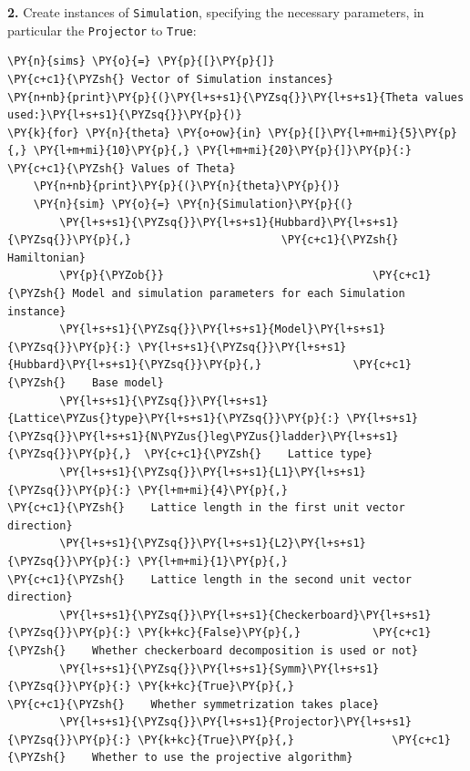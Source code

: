     \textbf{2.} Create instances of \texttt{Simulation}, specifying the
necessary parameters, in particular the \texttt{Projector} to
\texttt{True}:

    \begin{tcolorbox}[breakable, size=fbox, boxrule=1pt, pad at break*=1mm,colback=cellbackground, colframe=cellborder]
\begin{Verbatim}[commandchars=\\\{\}]
\PY{n}{sims} \PY{o}{=} \PY{p}{[}\PY{p}{]}                                \PY{c+c1}{\PYZsh{} Vector of Simulation instances}
\PY{n+nb}{print}\PY{p}{(}\PY{l+s+s1}{\PYZsq{}}\PY{l+s+s1}{Theta values used:}\PY{l+s+s1}{\PYZsq{}}\PY{p}{)}
\PY{k}{for} \PY{n}{theta} \PY{o+ow}{in} \PY{p}{[}\PY{l+m+mi}{5}\PY{p}{,} \PY{l+m+mi}{10}\PY{p}{,} \PY{l+m+mi}{20}\PY{p}{]}\PY{p}{:}                \PY{c+c1}{\PYZsh{} Values of Theta}
    \PY{n+nb}{print}\PY{p}{(}\PY{n}{theta}\PY{p}{)}
    \PY{n}{sim} \PY{o}{=} \PY{n}{Simulation}\PY{p}{(}
        \PY{l+s+s1}{\PYZsq{}}\PY{l+s+s1}{Hubbard}\PY{l+s+s1}{\PYZsq{}}\PY{p}{,}                       \PY{c+c1}{\PYZsh{} Hamiltonian}
        \PY{p}{\PYZob{}}                                \PY{c+c1}{\PYZsh{} Model and simulation parameters for each Simulation instance}
        \PY{l+s+s1}{\PYZsq{}}\PY{l+s+s1}{Model}\PY{l+s+s1}{\PYZsq{}}\PY{p}{:} \PY{l+s+s1}{\PYZsq{}}\PY{l+s+s1}{Hubbard}\PY{l+s+s1}{\PYZsq{}}\PY{p}{,}              \PY{c+c1}{\PYZsh{}    Base model}
        \PY{l+s+s1}{\PYZsq{}}\PY{l+s+s1}{Lattice\PYZus{}type}\PY{l+s+s1}{\PYZsq{}}\PY{p}{:} \PY{l+s+s1}{\PYZsq{}}\PY{l+s+s1}{N\PYZus{}leg\PYZus{}ladder}\PY{l+s+s1}{\PYZsq{}}\PY{p}{,}  \PY{c+c1}{\PYZsh{}    Lattice type}
        \PY{l+s+s1}{\PYZsq{}}\PY{l+s+s1}{L1}\PY{l+s+s1}{\PYZsq{}}\PY{p}{:} \PY{l+m+mi}{4}\PY{p}{,}                         \PY{c+c1}{\PYZsh{}    Lattice length in the first unit vector direction}
        \PY{l+s+s1}{\PYZsq{}}\PY{l+s+s1}{L2}\PY{l+s+s1}{\PYZsq{}}\PY{p}{:} \PY{l+m+mi}{1}\PY{p}{,}                         \PY{c+c1}{\PYZsh{}    Lattice length in the second unit vector direction}
        \PY{l+s+s1}{\PYZsq{}}\PY{l+s+s1}{Checkerboard}\PY{l+s+s1}{\PYZsq{}}\PY{p}{:} \PY{k+kc}{False}\PY{p}{,}           \PY{c+c1}{\PYZsh{}    Whether checkerboard decomposition is used or not}
        \PY{l+s+s1}{\PYZsq{}}\PY{l+s+s1}{Symm}\PY{l+s+s1}{\PYZsq{}}\PY{p}{:} \PY{k+kc}{True}\PY{p}{,}                    \PY{c+c1}{\PYZsh{}    Whether symmetrization takes place}
        \PY{l+s+s1}{\PYZsq{}}\PY{l+s+s1}{Projector}\PY{l+s+s1}{\PYZsq{}}\PY{p}{:} \PY{k+kc}{True}\PY{p}{,}               \PY{c+c1}{\PYZsh{}    Whether to use the projective algorithm}

\end{Verbatim}
\end{tcolorbox}
